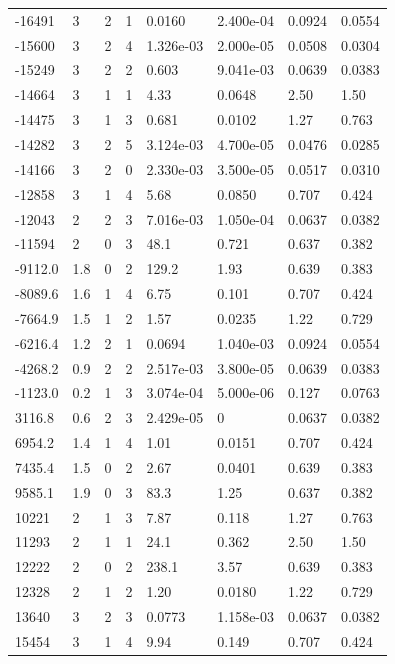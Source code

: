 \documentclass[preview]{standalone}
\begin{document}
{{\begin{tabular}{L{1.2cm}C{1.2cm} C{0.3cm}C{0.5cm} C{1.4cm}C{1.4cm} C{1.4cm}C{1.4cm}}
  -16491  &     3  & 2     &  1 &  0.0160  & 2.400e-04  & 0.0924 &  0.0554   \\ 
  -15600  &     3  & 2     &  4 &  1.326e-03  & 2.000e-05  & 0.0508 &  0.0304   \\ 
  -15249  &     3  & 2     &  2 &  0.603  & 9.041e-03  & 0.0639 &  0.0383   \\ 
  -14664  &     3  & 1     &  1 &  4.33  & 0.0648  & 2.50 &  1.50   \\ 
  -14475  &     3  & 1     &  3 &  0.681  & 0.0102  & 1.27 &  0.763   \\ 
  -14282  &     3  & 2     &  5 &  3.124e-03  & 4.700e-05  & 0.0476 &  0.0285   \\ 
  -14166  &     3  & 2     &  0 &  2.330e-03  & 3.500e-05  & 0.0517 &  0.0310   \\ 
  -12858  &     3  & 1     &  4 &  5.68  & 0.0850  & 0.707 &  0.424   \\ 
  -12043  &     2  & 2     &  3 &  7.016e-03  & 1.050e-04  & 0.0637 &  0.0382   \\ 
  -11594  &     2  & 0     &  3 &  48.1  & 0.721  & 0.637 &  0.382   \\ 
  -9112.0  &   1.8  & 0     &  2 &  129.2  & 1.93  & 0.639 &  0.383   \\ 
  -8089.6  &   1.6  & 1     &  4 &  6.75  & 0.101  & 0.707 &  0.424   \\ 
  -7664.9  &   1.5  & 1     &  2 &  1.57  & 0.0235  & 1.22 &  0.729   \\ 
  -6216.4  &   1.2  & 2     &  1 &  0.0694  & 1.040e-03  & 0.0924 &  0.0554   \\ 
  -4268.2  &   0.9  & 2     &  2 &  2.517e-03  & 3.800e-05  & 0.0639 &  0.0383   \\ 
  -1123.0  &   0.2  & 1     &  3 &  3.074e-04  & 5.000e-06  & 0.127 &  0.0763   \\ 
  3116.8  &   0.6  & 2     &  3 &  2.429e-05  & 0  & 0.0637 &  0.0382   \\ 
  6954.2  &   1.4  & 1     &  4 &  1.01  & 0.0151  & 0.707 &  0.424   \\ 
  7435.4  &   1.5  & 0     &  2 &  2.67  & 0.0401  & 0.639 &  0.383   \\ 
  9585.1  &   1.9  & 0     &  3 &  83.3  & 1.25  & 0.637 &  0.382   \\ 
  10221  &     2  & 1     &  3 &  7.87  & 0.118  & 1.27 &  0.763   \\ 
  11293  &     2  & 1     &  1 &  24.1  & 0.362  & 2.50 &  1.50   \\ 
  12222  &     2  & 0     &  2 &  238.1  & 3.57  & 0.639 &  0.383   \\ 
  12328  &     2  & 1     &  2 &  1.20  & 0.0180  & 1.22 &  0.729   \\ 
  13640  &     3  & 2     &  3 &  0.0773  & 1.158e-03  & 0.0637 &  0.0382   \\ 
  15454  &     3  & 1     &  4 &  9.94  & 0.149  & 0.707 &  0.424   \\ 
\hline 
\end{tabular} 

}}
\end{document}
